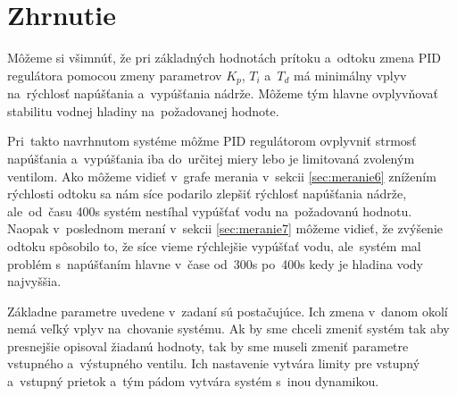 \documentclass{article}
\begin{document}
\clearpage

\section{Zhrnutie}
\label{sec:zhrnutie}


Môžeme si všimnúť, že pri základných hodnotách prítoku a~odtoku zmena PID regulátora pomocou zmeny parametrov
$K_p$, $T_i$ a~$T_d$ má minimálny vplyv na~rýchlosť napúšťania a~vypúšťania nádrže. Môžeme tým hlavne
ovplyvňovať stabilitu vodnej hladiny na~požadovanej hodnote.

Pri~takto navrhnutom systéme môžme PID regulátorom ovplyvniť strmosť napúšťania a~vypúšťania iba do~určitej
miery lebo je limitovaná zvoleným ventilom. Ako môžeme vidieť v~grafe merania v~sekcii \ref{sec:meranie6}
znížením rýchlosti odtoku sa nám síce podarilo zlepšiť rýchlosť napúšťania nádrže, ale~od~času 400s systém
nestíhal vypúšťať vodu na~požadovanú hodnotu. Naopak v~poslednom meraní v~sekcii \ref{sec:meranie7} môžeme
vidieť, že zvýšenie odtoku spôsobilo to, že síce vieme rýchlejšie vypúšťať vodu, ale~systém mal problém
s~napúšťaním hlavne v~čase od~300s po~400s kedy je hladina vody najvyššia.

Základne parametre uvedene v~zadaní sú postačujúce. Ich zmena v~danom okolí nemá veľký vplyv na~chovanie
systému. Ak by sme chceli zmeniť systém tak aby presnejšie opisoval žiadanú hodnoty, tak by sme museli
zmeniť parametre vstupného a~výstupného ventilu. Ich nastavenie vytvára limity pre vstupný a~vstupný
prietok a~tým pádom vytvára systém s~inou dynamikou.
\end{document}
